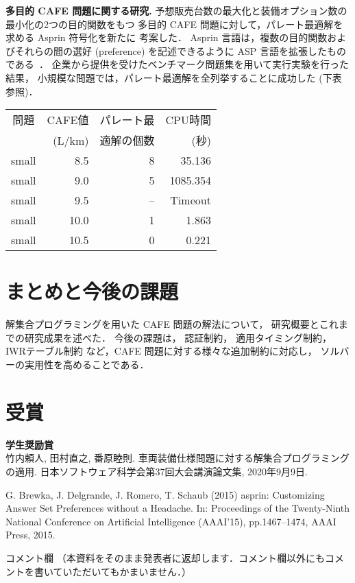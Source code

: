 \documentclass[a4j,10pt]{jarticle}
\begin{document}
\begin{multicols}{1}
\textbf{多目的 CAFE 問題に関する研究. }
予想販売台数の最大化と装備オプション数の最小化の2つの目的関数をもつ
多目的 CAFE 問題に対して，パレート最適解を求める Asprin 符号化を新たに
考案した．
Asprin 言語は，複数の目的関数およびそれらの間の選好 (preference)
を記述できるように ASP 言語を拡張したものである~\cite{brewka_15}．
%
企業から提供を受けたベンチマーク問題集を用いて実行実験を行った結果，
小規模な問題では，パレート最適解を全列挙することに成功した
(下表参照)．

\begin{center}
  \begin{tabular}{c|r|rr}
  問題   & CAFE値  & パレート最 & CPU時間 \\
         & (L/km)  & 適解の個数  & (秒) \\ \hline
  small  & 8.5   & 8             & 35.136     \\
  small  & 9.0   & 5             & 1085.354   \\
  small  & 9.5   & --            & Timeout    \\
  small  & 10.0  & 1             & 1.863      \\
  small  & 10.5  & 0             & 0.221      \\ \hline
 \end{tabular}
\end{center}


\section{まとめと今後の課題}
解集合プログラミングを用いた CAFE 問題の解法について，
研究概要とこれまでの研究成果を述べた．
今後の課題は，
認証制約，
適用タイミング制約，
IWRテーブル制約
など，CAFE 問題に対する様々な追加制約に対応し，
ソルバーの実用性を高めることである．

\section{受賞}

\noindent\textbf{学生奨励賞}\\
竹内頼人, 田村直之, 番原睦則.
車両装備仕様問題に対する解集合プログラミングの適用.
日本ソフトウェア科学会第37回大会講演論文集,
2020年9月9日. 

\begin{thebibliography}{10}
G. Brewka, J. Delgrande, J. Romero, T. Schaub (2015) 
asprin: Customizing Answer Set Preferences without a Headache.
In: Proceedings of the Twenty-Ninth National Conference on Artificial
Intelligence (AAAI'15), pp.1467--1474, AAAI Press, 2015.
\end{thebibliography}


\end{multicols}
\vfill
\noindent
{\gt コメント欄}
{\footnotesize
（本資料をそのまま発表者に返却します．コメント欄以外にもコメントを書いていただいてもかまいません．）}
\\
\fbox{\begin{minipage}{\textwidth}\noindent\\\\\end{minipage}}	
\end{document}
